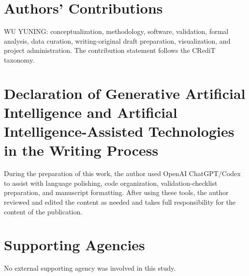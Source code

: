 ﻿\documentclass[12pt]{article}
\begin{document}
\section*{Authors' Contributions}

WU YUNING: conceptualization, methodology, software, validation, formal analysis, data curation, writing-original draft preparation, visualization, and project administration. The contribution statement follows the CRediT taxonomy.

\section*{Declaration of Generative Artificial Intelligence and Artificial Intelligence-Assisted Technologies in the Writing Process}

During the preparation of this work, the author used OpenAI ChatGPT/Codex to assist with language polishing, code organization, validation-checklist preparation, and manuscript formatting. After using these tools, the author reviewed and edited the content as needed and takes full responsibility for the content of the publication.

\section*{Supporting Agencies}

No external supporting agency was involved in this study.
\end{document}
